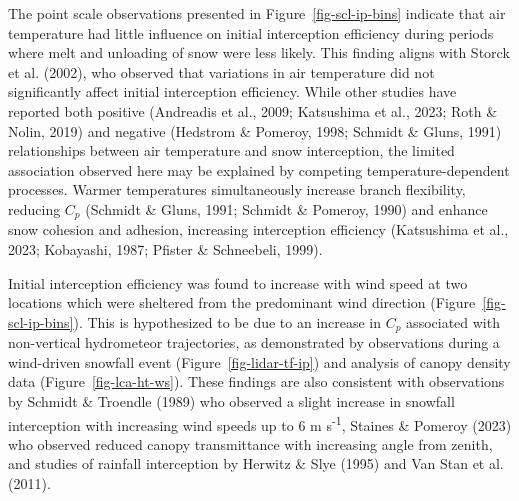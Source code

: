 \documentclass[
  letterpaper,
]{tex/uofsthesis-cs}
\begin{document}
The point scale observations presented in Figure~\ref{fig-scl-ip-bins}
indicate that air temperature had little influence on initial
interception efficiency during periods where melt and unloading of snow
were less likely. This finding aligns with Storck et al. (2002), who
observed that variations in air temperature did not significantly affect
initial interception efficiency. While other studies have reported both
positive (Andreadis et al., 2009; Katsushima et al., 2023; Roth \&
Nolin, 2019) and negative (Hedstrom \& Pomeroy, 1998; Schmidt \& Gluns,
1991) relationships between air temperature and snow interception, the
limited association observed here may be explained by competing
temperature-dependent processes. Warmer temperatures simultaneously
increase branch flexibility, reducing \(C_p\) (Schmidt \& Gluns, 1991;
Schmidt \& Pomeroy, 1990) and enhance snow cohesion and adhesion,
increasing interception efficiency (Katsushima et al., 2023; Kobayashi,
1987; Pfister \& Schneebeli, 1999).

Initial interception efficiency was found to increase with wind speed at
two locations which were sheltered from the predominant wind direction
(Figure~\ref{fig-scl-ip-bins}). This is hypothesized to be due to an
increase in \(C_p\) associated with non-vertical hydrometeor
trajectories, as demonstrated by observations during a wind-driven
snowfall event (Figure~\ref{fig-lidar-tf-ip}) and analysis of canopy
density data (Figure~\ref{fig-lca-ht-ws}). These findings are also
consistent with observations by Schmidt \& Troendle (1989) who observed
a slight increase in snowfall interception with increasing wind speeds
up to 6 m s\textsuperscript{-1}, Staines \& Pomeroy (2023) who observed
reduced canopy transmittance with increasing angle from zenith, and
studies of rainfall interception by Herwitz \& Slye (1995) and Van Stan
et al. (2011).
\end{document}
